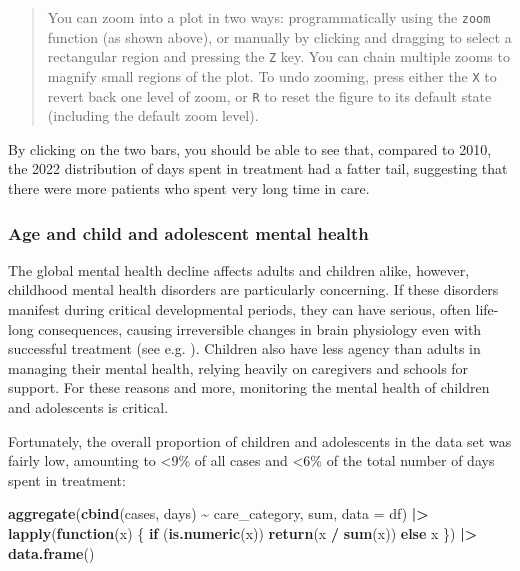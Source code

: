 \documentclass[
]{book}
\newenvironment{Shaded}{\begin{snugshade}}{\end{snugshade}}
\newcommand{\AttributeTok}[1]{\textcolor[rgb]{0.13,0.29,0.53}{#1}}
\newcommand{\ControlFlowTok}[1]{\textcolor[rgb]{0.13,0.29,0.53}{\textbf{#1}}}
\newcommand{\FunctionTok}[1]{\textcolor[rgb]{0.13,0.29,0.53}{\textbf{#1}}}
\newcommand{\NormalTok}[1]{#1}
\newcommand{\SpecialCharTok}[1]{\textcolor[rgb]{0.81,0.36,0.00}{\textbf{#1}}}
\theoremstyle{definition}
\theoremstyle{definition}
\theoremstyle{definition}
\theoremstyle{definition}
\theoremstyle{remark}
\begin{document}
\begin{quote}
You can zoom into a plot in two ways: programmatically using the \texttt{zoom} function (as shown above), or manually by clicking and dragging to select a rectangular region and pressing the \texttt{Z} key. You can chain multiple zooms to magnify small regions of the plot. To undo zooming, press either the \texttt{X} to revert back one level of zoom, or \texttt{R} to reset the figure to its default state (including the default zoom level).
\end{quote}

By clicking on the two bars, you should be able to see that, compared to 2010, the 2022 distribution of days spent in treatment had a fatter tail, suggesting that there were more patients who spent very long time in care.

\subsubsection{Age and child and adolescent mental health}\label{age-and-child-and-adolescent-mental-health}

The global mental health decline affects adults and children alike, however, childhood mental health disorders are particularly concerning. If these disorders manifest during critical developmental periods, they can have serious, often life-long consequences, causing irreversible changes in brain physiology even with successful treatment (see e.g. ). Children also have less agency than adults in managing their mental health, relying heavily on caregivers and schools for support. For these reasons and more, monitoring the mental health of children and adolescents is critical.

Fortunately, the overall proportion of children and adolescents in the data set was fairly low, amounting to \textless9\% of all cases and \textless6\% of the total number of days spent in treatment:

\begin{Shaded}
\begin{Highlighting}[]
\FunctionTok{aggregate}\NormalTok{(}\FunctionTok{cbind}\NormalTok{(cases, days) }\SpecialCharTok{\textasciitilde{}}\NormalTok{ care\_category, sum, }\AttributeTok{data =}\NormalTok{ df) }\SpecialCharTok{|\textgreater{}}
  \FunctionTok{lapply}\NormalTok{(}\ControlFlowTok{function}\NormalTok{(x) \{ }\ControlFlowTok{if}\NormalTok{ (}\FunctionTok{is.numeric}\NormalTok{(x)) }\FunctionTok{return}\NormalTok{(x }\SpecialCharTok{/} \FunctionTok{sum}\NormalTok{(x)) }\ControlFlowTok{else}\NormalTok{ x \}) }\SpecialCharTok{|\textgreater{}}
  \FunctionTok{data.frame}\NormalTok{()}
\end{Highlighting}
\end{Shaded}
\end{document}
